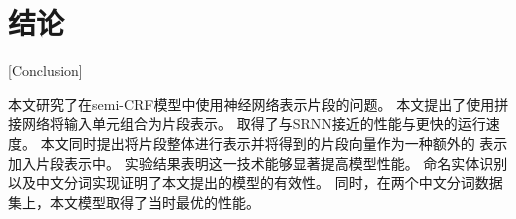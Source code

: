 \section{结论}[Conclusion]

本文研究了在semi-CRF模型中使用神经网络表示片段的问题。
本文提出了使用拼接网络将输入单元组合为片段表示。
取得了与SRNN接近的性能与更快的运行速度。
本文同时提出将片段整体进行表示并将得到的片段向量作为一种额外的
表示加入片段表示中。
实验结果表明这一技术能够显著提高模型性能。
命名实体识别以及中文分词实现证明了本文提出的模型的有效性。
同时，在两个中文分词数据集上，本文模型取得了当时最优的性能。
